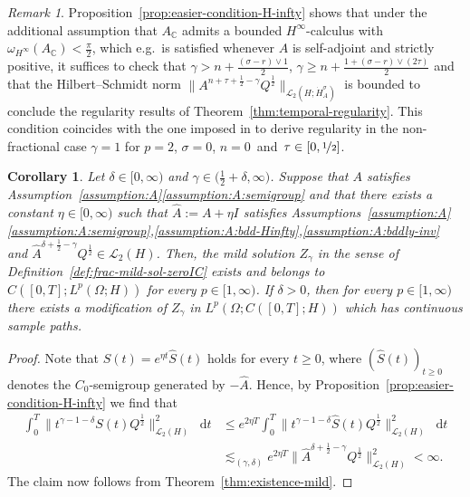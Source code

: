 \documentclass[reqno]{amsart}
\numberwithin{equation}{section}
\newcommand{\C}{\mathbb{C}}
\newcommand{\rd}{\mathop{}\!\mathrm{d}}
\newcommand{\Hdot}[1]{\dot{H}^{#1}_A}
\newtheorem{corollary}[lemma]{Corollary}
\theoremstyle{remark}
\newtheorem{remark}[lemma]{Remark}
\theoremstyle{definition}
\begin{document}
\begin{remark}\label{rem:easier-condition-H-infty} 
	Proposition~\ref{prop:easier-condition-H-infty} 
	shows that under the additional 
	assumption that $A_\C$ admits a 
	bounded $H^\infty$-calculus 
	with $\omega_{H^\infty}(A_\C)<\tfrac{\pi}{2}$,  
	which e.g.\ is satisfied whenever  
	$A$ is self-adjoint and strictly positive, 
	it suffices to check 
	that 
	$\gamma > n + \frac{ (\sigma-r) \vee 1 }{2} $,  
	$\gamma \geq n+\frac{1+ (\sigma-r)\vee (2\tau) }{2}$ 
	and that 
	the Hilbert--Schmidt 
	norm 
	$\| A^{ n+ \tau + \frac{1}{2} - \gamma } Q^{\frac{1}{2}} 
	\|_{\mathscr L_2(H;\Hdot \sigma)}$
	is bounded to conclude 
	the regularity results 
	of Theorem~\ref{thm:temporal-regularity}. 
	This condition coincides with 
	the one imposed in 
	\cite[Section~4,~Theorem~6]{Kovacs2013} 
	to derive regularity 
	in the non-fractional case 
	$\gamma=1$ for $p=2$, $\sigma=0$, 
	$n=0$~and~$\tau \in [0, \nicefrac{1}{2}]$. 
\end{remark} 

\begin{corollary}\label{cor:easier-condition-H-infty-Aplusdelta}
	Let $\delta \in [0,\infty)$
	and $\gamma \in\bigl(\frac{1}{2}+\delta , \infty\bigr)$.
	Suppose that $A$ satisfies
	Assumption~\textup{\ref{assumption:A}\ref{assumption:A:semigroup}} 
	and that there exists a constant $\eta \in[0,\infty)$
	such that $\widehat A := A + \eta I$ 
	satisfies 
	Assumptions~\textup{\ref{assumption:A}\ref{assumption:A:semigroup},\ref{assumption:A:bdd-Hinfty},\ref{assumption:A:bddly-inv}} 
	and 
	$\widehat A^{\delta + \frac{1}{2}-\gamma} Q^{\frac{1}{2}} 
	\in \mathscr L_2(H)$. 
	Then, the mild solution
	$Z_\gamma$ in the sense of Definition~\textup{\ref{def:frac-mild-sol-zeroIC}} 
	exists and belongs to $C([0,T];L^p(\Omega;H))$ 
	for every $p\in[1,\infty)$.
	If $\delta>0$, then 
	for every $p \in [1,\infty)$ 
	there exists a modification of $Z_\gamma$ 
	in $L^p(\Omega;C([0,T];H))$  
	which has continuous sample paths. 
\end{corollary}

\begin{proof}
	Note that 
	$S(t) = e^{\eta t} \widehat S(t)$ 
	holds for every $t\geq 0$, 
	where $( \widehat S(t) )_{t\geq 0}$ denotes
	the $C_0$-semigroup
	generated by $-\widehat A$. 
	Hence, by Proposition~\ref{prop:easier-condition-H-infty} 
	we find that 
	\begin{align*}
	\int_0^T 
	\bigl\| t^{\gamma-1-\delta} S(t) Q^{\frac{1}{2}} \bigr\|_{
		\mathscr L_2(H)}^2 \rd t 
	&\le
	e^{2 \eta T}
	\int_0^T 
	\bigl\| t^{\gamma-1-\delta} \widehat S(t) Q^{\frac{1}{2}} \bigr\|_{
		\mathscr L_2(H)}^2 \rd t
	\\ 
	&\lesssim_{(\gamma,\delta)} 
	e^{2 \eta T}
	\bigl\| \widehat A^{ \delta+\frac{1}{2}-\gamma } Q^{\frac{1}{2}} 
	\bigr\|_{\mathscr L_2(H)}^2 < \infty.
	\end{align*}
	The claim now follows from 
	Theorem~\ref{thm:existence-mild}.
\end{proof}
\end{document}

